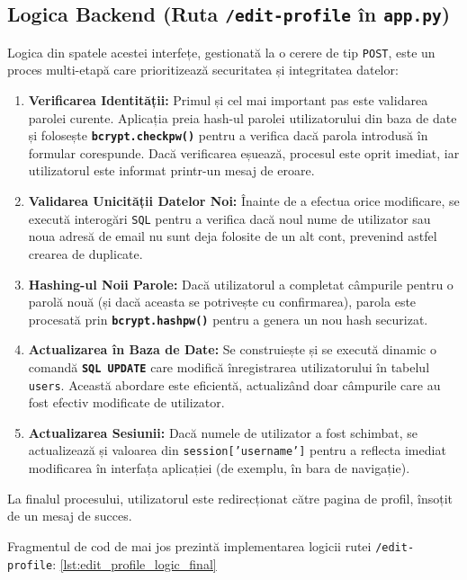 \documentclass[12pt, a4paper, oneside, romanian]{teza-upb}
\begin{document}
\subsection{Logica Backend (Ruta \texttt{/edit-profile} în \texttt{app.py})}
Logica din spatele acestei interfețe, gestionată la o cerere de tip \texttt{POST}, este un proces multi-etapă care prioritizează securitatea și integritatea datelor:
\begin{enumerate}
	\item \textbf{Verificarea Identității:} Primul și cel mai important pas este validarea parolei curente. Aplicația preia hash-ul parolei utilizatorului din baza de date și folosește \textbf{\texttt{bcrypt.checkpw()}} pentru a verifica dacă parola introdusă în formular corespunde. Dacă verificarea eșuează, procesul este oprit imediat, iar utilizatorul este informat printr-un mesaj de eroare.
	
	\item \textbf{Validarea Unicității Datelor Noi:} Înainte de a efectua orice modificare, se execută interogări \texttt{SQL} pentru a verifica dacă noul nume de utilizator sau noua adresă de email nu sunt deja folosite de un alt cont, prevenind astfel crearea de duplicate.
	
	\item \textbf{Hashing-ul Noii Parole:} Dacă utilizatorul a completat câmpurile pentru o parolă nouă (și dacă aceasta se potrivește cu confirmarea), parola este procesată prin \textbf{\texttt{bcrypt.hashpw()}} pentru a genera un nou hash securizat.
	
	\item \textbf{Actualizarea în Baza de Date:} Se construiește și se execută dinamic o comandă \textbf{\texttt{SQL UPDATE}} care modifică înregistrarea utilizatorului în tabelul \texttt{users}. Această abordare este eficientă, actualizând doar câmpurile care au fost efectiv modificate de utilizator.
	
	\item \textbf{Actualizarea Sesiunii:} Dacă numele de utilizator a fost schimbat, se actualizează și valoarea din \texttt{session['username']} pentru a reflecta imediat modificarea în interfața aplicației (de exemplu, în bara de navigație).
\end{enumerate}
La finalul procesului, utilizatorul este redirecționat către pagina de profil, însoțit de un mesaj de succes.

Fragmentul de cod de mai jos prezintă implementarea logicii rutei \texttt{/edit-profile}: \ref{lst:edit_profile_logic_final}
\end{document}
